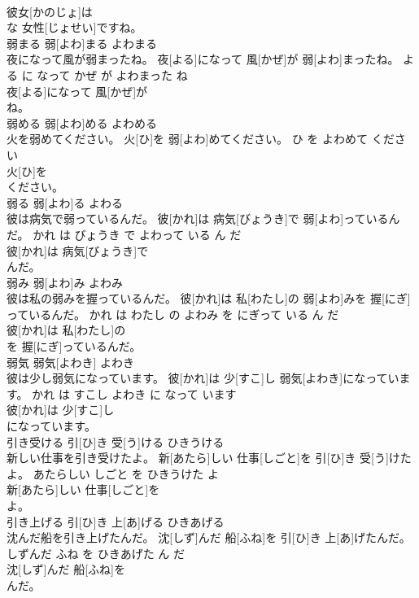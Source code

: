 \documentclass[8pt]{extreport}
\begin{document}
\begin{CJK}{UTF8}{min}
\\	彼女[かのじょ]は
\\	な 女性[じょせい]ですね。			
\\	弱まる	弱[よわ]まる	よわまる	
\\	夜になって風が弱まったね。	夜[よる]になって 風[かぜ]が 弱[よわ]まったね。	よる に なって かぜ が よわまった ね	
\\	夜[よる]になって 風[かぜ]が
\\	ね。			
\\	弱める	弱[よわ]める	よわめる	
\\	火を弱めてください。	火[ひ]を 弱[よわ]めてください。	ひ を よわめて ください	
\\	火[ひ]を
\\	ください。			
\\	弱る	弱[よわ]る	よわる	
\\	彼は病気で弱っているんだ。	彼[かれ]は 病気[びょうき]で 弱[よわ]っているんだ。	かれ は びょうき で よわって いる ん だ	
\\	彼[かれ]は 病気[びょうき]で
\\	んだ。			
\\	弱み	弱[よわ]み	よわみ	
\\	彼は私の弱みを握っているんだ。	彼[かれ]は 私[わたし]の 弱[よわ]みを 握[にぎ]っているんだ。	かれ は わたし の よわみ を にぎって いる ん だ	
\\	彼[かれ]は 私[わたし]の
\\	を 握[にぎ]っているんだ。			
\\	弱気	弱気[よわき]	よわき	
\\	彼は少し弱気になっています。	彼[かれ]は 少[すこ]し 弱気[よわき]になっています。	かれ は すこし よわき に なって います	
\\	彼[かれ]は 少[すこ]し
\\	になっています。			
\\	引き受ける	引[ひ]き 受[う]ける	ひきうける	
\\	新しい仕事を引き受けたよ。	新[あたら]しい 仕事[しごと]を 引[ひ]き 受[う]けたよ。	あたらしい しごと を ひきうけた よ	
\\	新[あたら]しい 仕事[しごと]を
\\	よ。			
\\	引き上げる	引[ひ]き 上[あ]げる	ひきあげる	
\\	沈んだ船を引き上げたんだ。	沈[しず]んだ 船[ふね]を 引[ひ]き 上[あ]げたんだ。	しずんだ ふね を ひきあげた ん だ	
\\	沈[しず]んだ 船[ふね]を
\\	んだ。			

\end{CJK}
\end{document}
